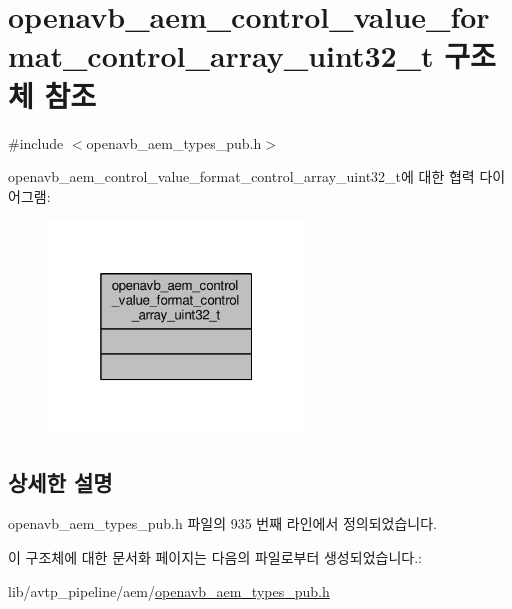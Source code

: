\hypertarget{structopenavb__aem__control__value__format__control__array__uint32__t}{}\section{openavb\+\_\+aem\+\_\+control\+\_\+value\+\_\+format\+\_\+control\+\_\+array\+\_\+uint32\+\_\+t 구조체 참조}
\label{structopenavb__aem__control__value__format__control__array__uint32__t}


{\ttfamily \#include $<$openavb\+\_\+aem\+\_\+types\+\_\+pub.\+h$>$}



openavb\+\_\+aem\+\_\+control\+\_\+value\+\_\+format\+\_\+control\+\_\+array\+\_\+uint32\+\_\+t에 대한 협력 다이어그램\+:
\nopagebreak
\begin{figure}[H]
\begin{center}
\leavevmode
\includegraphics[width=193pt]{structopenavb__aem__control__value__format__control__array__uint32__t__coll__graph}
\end{center}
\end{figure}


\subsection{상세한 설명}


openavb\+\_\+aem\+\_\+types\+\_\+pub.\+h 파일의 935 번째 라인에서 정의되었습니다.



이 구조체에 대한 문서화 페이지는 다음의 파일로부터 생성되었습니다.\+:\begin{DoxyCompactItemize}
\item 
lib/avtp\+\_\+pipeline/aem/\hyperlink{openavb__aem__types__pub_8h}{openavb\+\_\+aem\+\_\+types\+\_\+pub.\+h}\end{DoxyCompactItemize}

